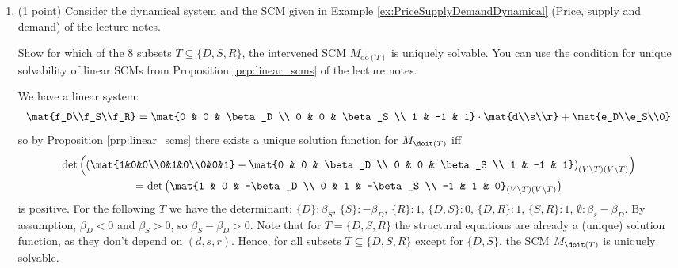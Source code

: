 \begin{enumerate}
\item (1 point) Consider the dynamical system and the SCM given in Example \ref*{ex:PriceSupplyDemandDynamical} (Price, supply and demand) of the lecture notes.

Show for which of the 8 subsets $T \subseteq \{D, S, R\}$, the intervened SCM $M_{\text{do}(T)}$ is uniquely solvable. You can use the condition for unique solvability of linear SCMs from Proposition \ref*{prp:linear_scms} of the lecture notes.
\begin{gradedsolution}
We have a linear system:
\begin{align*}
	\mat{f_D\\f_S\\f_R} = \mat{0 & 0 & \beta_D \\ 0 & 0 & \beta_S \\ 1 & -1 & 1}\cdot \mat{d\\s\\r}+\mat{e_D\\e_S\\0}
\end{align*}
so by Proposition \ref*{prp:linear_scms} there exists a unique solution function for $M_{\doit(T)}$ iff
\begin{multline*}
	\det\left(\left(\mat{1&0&0\\0&1&0\\0&0&1} - \mat{0 & 0 & \beta_D \\ 0 & 0 & \beta_S \\ 1 & -1 & 1}\right)_{(V\setminus T)(V\setminus T)}\right) \\
	= \det\left(\mat{1 & 0 & -\beta_D \\ 0 & 1 & -\beta_S \\ -1 & 1 & 0}_{(V\setminus T)(V\setminus T)}\right)
\end{multline*}
is positive. For the following $T$ we have the determinant: $\{D\}: \beta_S$, $\{S\}:-\beta_D$, $\{R\}: 1$, $\{D, S\}: 0$, $\{D, R\}: 1$, $\{S, R\}: 1$, $\emptyset: \beta_s-\beta_D$. By assumption, $\beta_D < 0$ and $\beta_S> 0$, so $\beta_S-\beta_D > 0$. Note that for $T=\{D, S, R\}$ the structural equations are already a (unique) solution function, as they don't depend on $(d, s, r)$. Hence, for all subsets $T\subseteq\{D, S, R\}$ except for $\{D, S\}$, the SCM $M_{\doit(T)}$ is uniquely solvable.
\end{gradedsolution}

\end{enumerate}

